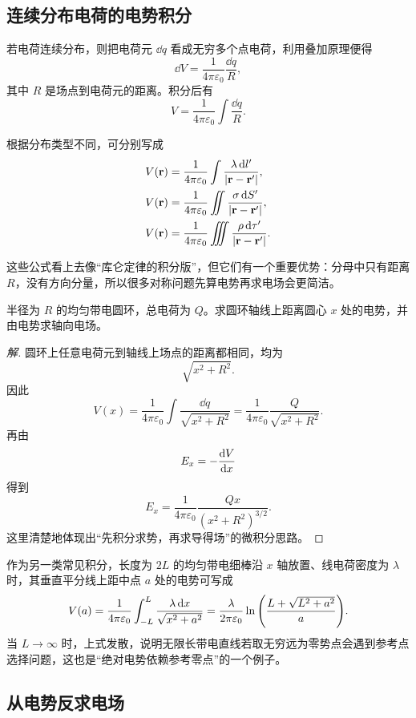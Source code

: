 \subsection{连续分布电荷的电势积分}

若电荷连续分布，则把电荷元 $\dd q$ 看成无穷多个点电荷，利用叠加原理便得
\[
\dd V=\frac{1}{4\pi\varepsilon_0}\frac{\dd q}{R},
\]
其中 $R$ 是场点到电荷元的距离。积分后有
\[
V=\frac{1}{4\pi\varepsilon_0}\int \frac{\dd q}{R}.
\]

根据分布类型不同，可分别写成
\begin{align*}
V(\vb r)&=\frac{1}{4\pi\varepsilon_0}\int \frac{\lambda\,\dd l'}{\abs{\vb r-\vb r'}},\\
V(\vb r)&=\frac{1}{4\pi\varepsilon_0}\iint \frac{\sigma\,\dd S'}{\abs{\vb r-\vb r'}},\\
V(\vb r)&=\frac{1}{4\pi\varepsilon_0}\iiint \frac{\rho\,\dd \tau'}{\abs{\vb r-\vb r'}}.
\end{align*}

这些公式看上去像“库仑定律的积分版”，但它们有一个重要优势：分母中只有距离 $R$，没有方向分量，所以很多对称问题先算电势再求电场会更简洁。

\begin{example}
半径为 $R$ 的均匀带电圆环，总电荷为 $Q$。求圆环轴线上距离圆心 $x$ 处的电势，并由电势求轴向电场。
\end{example}

\begin{proof}[解]
圆环上任意电荷元到轴线上场点的距离都相同，均为
\[
\sqrt{x^2+R^2}.
\]
因此
\[
V(x)=\frac{1}{4\pi\varepsilon_0}\int \frac{\dd q}{\sqrt{x^2+R^2}}
=\frac{1}{4\pi\varepsilon_0}\frac{Q}{\sqrt{x^2+R^2}}.
\]
再由
\[
E_x=-\dv{V}{x}
\]
得到
\[
E_x=\frac{1}{4\pi\varepsilon_0}\frac{Qx}{(x^2+R^2)^{3/2}}.
\]
这里清楚地体现出“先积分求势，再求导得场”的微积分思路。
\end{proof}

作为另一类常见积分，长度为 $2L$ 的均匀带电细棒沿 $x$ 轴放置、线电荷密度为 $\lambda$ 时，其垂直平分线上距中点 $a$ 处的电势可写成
\[
V(a)=\frac{1}{4\pi\varepsilon_0}\int_{-L}^{L}\frac{\lambda\,\dd x}{\sqrt{x^2+a^2}}
=\frac{\lambda}{2\pi\varepsilon_0}\ln\qty(\frac{L+\sqrt{L^2+a^2}}{a}).
\]
当 $L\to \infty$ 时，上式发散，说明无限长带电直线若取无穷远为零势点会遇到参考点选择问题，这也是“绝对电势依赖参考零点”的一个例子。

\subsection{从电势反求电场}

